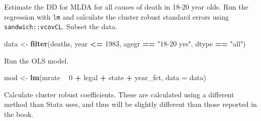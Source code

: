 \documentclass[]{book}
\newenvironment{Shaded}{\begin{snugshade}}{\end{snugshade}}
\newcommand{\KeywordTok}[1]{\textcolor[rgb]{0.13,0.29,0.53}{\textbf{#1}}}
\newcommand{\DataTypeTok}[1]{\textcolor[rgb]{0.13,0.29,0.53}{#1}}
\newcommand{\DecValTok}[1]{\textcolor[rgb]{0.00,0.00,0.81}{#1}}
\newcommand{\StringTok}[1]{\textcolor[rgb]{0.31,0.60,0.02}{#1}}
\newcommand{\OperatorTok}[1]{\textcolor[rgb]{0.81,0.36,0.00}{\textbf{#1}}}
\newcommand{\NormalTok}[1]{#1}
\theoremstyle{definition}
\theoremstyle{definition}
\theoremstyle{definition}
\theoremstyle{remark}
\begin{document}
Estimate the DD for MLDA for all causes of death in 18-20 year olds. Run
the regression with \texttt{lm} and calculate the cluster robust
standard errors using \texttt{sandwich::vcovCL}. Subset the data.

\begin{Shaded}
\begin{Highlighting}[]
\NormalTok{data <-}\StringTok{ }\KeywordTok{filter}\NormalTok{(deaths, year }\OperatorTok{<=}\StringTok{ }\DecValTok{1983}\NormalTok{, agegr }\OperatorTok{==}\StringTok{ "18-20 yrs"}\NormalTok{, dtype }\OperatorTok{==}\StringTok{ "all"}\NormalTok{)}
\end{Highlighting}
\end{Shaded}

Run the OLS model.

\begin{Shaded}
\begin{Highlighting}[]
\NormalTok{mod <-}\StringTok{ }\KeywordTok{lm}\NormalTok{(mrate }\OperatorTok{~}\StringTok{ }\DecValTok{0} \OperatorTok{+}\StringTok{ }\NormalTok{legal }\OperatorTok{+}\StringTok{ }\NormalTok{state }\OperatorTok{+}\StringTok{ }\NormalTok{year_fct, }\DataTypeTok{data =}\NormalTok{ data)}
\end{Highlighting}
\end{Shaded}

Calculate cluster robust coefficients. These are calculated using a
different method than Stata uses, and thus will be slightly different
than those reported in the book.

\begin{Shaded}
\end{Shaded}
\end{document}
